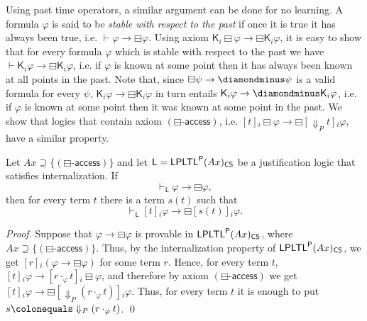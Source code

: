 \documentclass[envcountsect,envcountsame,oribibl,orivec]{llncs}
\newcommand{\limplies}{\rightarrow}
\newcommand{\lonce}{\diamondminus}
\newcommand{\lsofar}{\boxminus}
\newcommand{\LPLTLp}{\textsf{LPLTL}^{\sf P}}
\newcommand{\lknows}{\mathsf{K}}
\newcommand{\jbox}[1]{\left[#1\right]\!}
\newcommand{\talwaysaccess}{\Downarrow}
\newcommand{\CS}{\textsf{CS}}
\newcommand{\agent}{i}
\newcommand{\pastaccessprinciple}{\ensuremath{(\lsofar\textsf{-access})}}
\renewcommand{\phi}{\varphi}
\begin{document}
Using past time operators, a similar argument can be done for no learning. A formula $\phi$ is said to be \textit{stable with respect to the past} if once it is true it has always been true, i.e. $\vdash \phi \to \lsofar \phi$. Using axiom $\lknows_\agent \lsofar \phi \limplies \lsofar \lknows_\agent \phi$, it is easy to show that for every formula $\phi$ which is  stable with respect to the past we have $\vdash \lknows_\agent \phi \to \lsofar \lknows_\agent \phi$, i.e. if $\phi$ is known at some point then it has always been known at all points in the past. Note that, since $\lsofar \psi \limplies \lonce \psi$ is a valid formula for every $\psi$, $\lknows_\agent \phi \to \lsofar \lknows_\agent \phi$  in turn entails $\lknows_\agent \phi \to \lonce \lknows_\agent \phi$, i.e. if $\phi$ is known at some point then it was known at some point in the past. We show that logics that contain axiom $\pastaccessprinciple$, i.e. $\jbox{t}_\agent \lsofar \phi \limplies \lsofar \jbox{\talwaysaccess_P t}_\agent \phi$, have a similar property.

\begin{theorem}\label{thm: pastaccess principle-no learning}
	Let $Ax \supseteq \{ \pastaccessprinciple \}$ and let $\mathsf{L} = \LPLTLp(Ax)_\CS$ be a justification logic that satisfies internalization. If 
	\[
	\vdash_\mathsf{L} \phi \to \lsofar \phi,
	\]
	then for every term $t$ there is a term $s(t)$ such that
	\[
	\vdash_\mathsf{L} \jbox{t}_\agent \phi \to \lsofar \jbox{s(t)}_\agent \phi.
	\]
\end{theorem}
\begin{proof}
	Suppose that $\phi \to \lsofar \phi$ is provable in $\LPLTLp(Ax)_\CS$, where $Ax \supseteq \{ \pastaccessprinciple \}$. Thus, by the internalization property of $\LPLTLp(Ax)_\CS$, we get $\jbox{r}_\agent (\phi \to \lsofar \phi)$  for some term $r$. Hence, for every term $t$, $\jbox{t}_\agent \phi \to \jbox{r \cdot_\phi t}_\agent \lsofar \phi$, and therefore by axiom $\pastaccessprinciple$ we get $\jbox{t}_\agent \phi \to \lsofar \jbox{\talwaysaccess_P (r \cdot_\phi t)}_\agent \phi$. Thus, for every term $t$ it is enough to put $s \colonequals \talwaysaccess_P (r \cdot_\phi t)$. \qed  
\end{proof}
\end{document}
